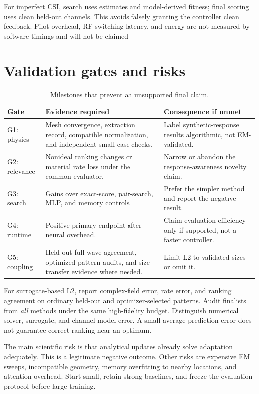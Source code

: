 \documentclass[conference]{IEEEtran}
\begin{document}
For imperfect CSI, search uses estimates and model-derived fitness; final scoring uses clean held-out channels. This avoids falsely granting the controller clean feedback. Pilot overhead, RF switching latency, and energy are not measured by software timings and will not be claimed.

\section{Validation gates and risks}
\begin{table}[t]
\caption{Milestones that prevent an unsupported final claim.}
\small
\begin{tabularx}{\linewidth}{@{}p{19mm}YY@{}}
\toprule
Gate & Evidence required & Consequence if unmet\\
\midrule
G1: physics & Mesh convergence, extraction record, compatible normalization, and independent small-case checks. & Label synthetic-response results algorithmic, not EM-validated.\\
G2: relevance & Nonideal ranking changes or material rate loss under the common evaluator. & Narrow or abandon the response-awareness novelty claim.\\
G3: search & Gains over exact-score, pair-search, MLP, and memory controls. & Prefer the simpler method and report the negative result.\\
G4: runtime & Positive primary endpoint after neural overhead. & Claim evaluation efficiency only if supported, not a faster controller.\\
G5: coupling & Held-out full-wave agreement, optimized-pattern audits, and size-transfer evidence where needed. & Limit L2 to validated sizes or omit it.\\
\bottomrule
\end{tabularx}
\end{table}

For surrogate-based L2, report complex-field error, rate error, and ranking agreement on ordinary held-out and optimizer-selected patterns. Audit finalists from \emph{all} methods under the same high-fidelity budget. Distinguish numerical solver, surrogate, and channel-model error. A small average prediction error does not guarantee correct ranking near an optimum.

The main scientific risk is that analytical updates already solve adaptation adequately. This is a legitimate negative outcome. Other risks are expensive EM sweeps, incompatible geometry, memory overfitting to nearby locations, and attention overhead. Start small, retain strong baselines, and freeze the evaluation protocol before large training.
\end{document}
